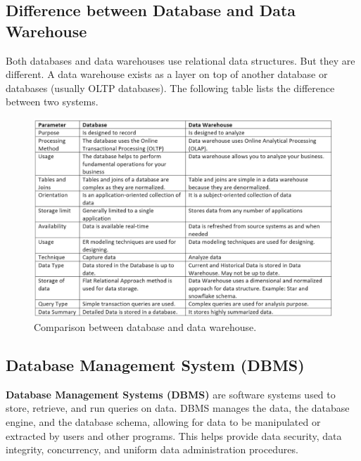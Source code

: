 \documentclass[
]{book}
\begin{document}
\hypertarget{difference-between-database-and-data-warehouse}{%
\subsection{Difference between Database and Data Warehouse}\label{difference-between-database-and-data-warehouse}}

Both databases and data warehouses use relational data structures. But they are different. A data warehouse exists as a layer on top of another database or databases (usually OLTP databases). The following table lists the difference between two systems.

\begin{figure}

{\centering \includegraphics[width=0.99\linewidth]{img01/w01-databaseVSdatawarehouse} 

}

\caption{Comparison between database and data warehouse.}\label{fig:unnamed-chunk-10}
\end{figure}

\hypertarget{database-management-system-dbms}{%
\subsection{Database Management System (DBMS)}\label{database-management-system-dbms}}

\textbf{Database Management Systems (DBMS)} are software systems used to store, retrieve, and run queries on data. DBMS manages the data, the database engine, and the database schema, allowing for data to be manipulated or extracted by users and other programs. This helps provide data security, data integrity, concurrency, and uniform data administration procedures.
\end{document}
